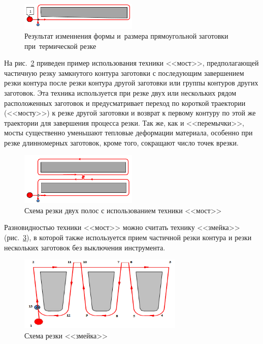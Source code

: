 \documentclass[11pt,twoside,openany]{report}
\begin{document}
\begin{figure}[h]
  \begin{center}
  \includegraphics[width=0.5\textwidth]{saber.png}
  \caption{
    Результат изменнения формы
    и~размера прямоугольной заготовки
    при~термической резке
    }
  \label{saber}
  \end{center}
\end{figure}

На рис.~\ref{bridge}
приведен пример использования техники <<мост>>,
предполагающей  частичную резку замкнутого контура
заготовки с последующим завершением резки контура
после резки контура другой заготовки или
группы контуров других заготовок.
Эта техника используется при резке двух или
нескольких рядом расположенных заготовок и
предусматривает переход по короткой траектории (<<мосту>>)
к резке другой заготовки и возврат к первому контуру
по этой же траектории для завершения процесса резки.
Так же, как и <<перемычки>>,
мосты существенно уменьшают тепловые деформации материала,
особенно при резке длинномерных заготовок,
кроме того, сокращают число точек врезки.

\begin{figure}[h]
  \begin{center}
  \includegraphics[width=0.5\textwidth]{bridge.png}
  \caption{Схема резки двух полос с использованием техники <<мост>>}
  \label{bridge}
  \end{center}
\end{figure}

Разновидностью техники <<мост>> можно считать технику <<змейка>>
(рис.~\ref{snake}),
в которой также используется прием
частичной резки контура и резки
нескольких заготовок без выключения инструмента.

\begin{figure}[h]
  \begin{center}
  \includegraphics[width=0.7\textwidth]{snake.png}
  \caption{Схема резки <<змейка>>}
  \label{snake}
  \end{center}
\end{figure}
\end{document}
